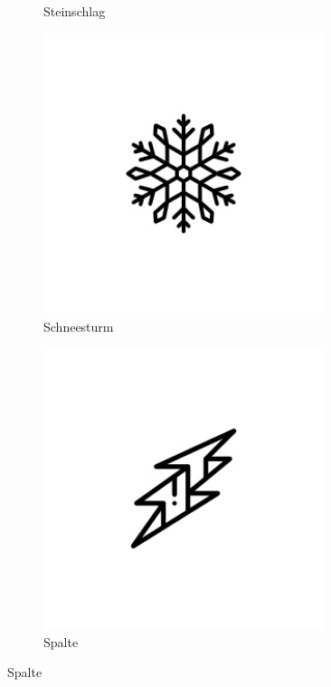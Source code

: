 \documentclass[11pt,english,german]{report}
\theoremstyle{definition}
\begin{document}
\begin{figure}[H]
\begin{subfigure}{.25\textwidth}
		\caption[Erdrutch / Steinschlag]
		{Steinschlag}
	\end{subfigure}%
	\begin{subfigure}{.25\textwidth}
		\centering
		\includegraphics[width=0.9\textwidth]{img/prototype/snowflake.jpg}
		\caption[Schneesturm]
		{Schneesturm}
	\end{subfigure}%
	\begin{subfigure}{.25\textwidth}
		\centering
		\includegraphics[width=0.9\textwidth]{img/prototype/crack.jpg}
		\caption[Spalte]
		{Spalte}
	\end{subfigure}%
\end{figure}
\end{document}
